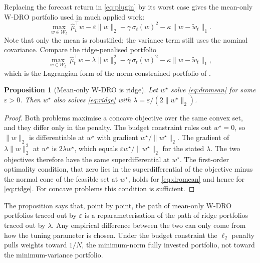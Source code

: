 \documentclass[11pt]{article}
\newtheorem{proposition}{Proposition}
\begin{document}
Replacing the forecast return in \eqref{eq:plugin} by its worst case gives the mean-only W-DRO portfolio used in much applied work:
\begin{equation}\label{eq:dromean}
\max_{w\in\mathcal{W}_t}\ \hat\mu_t^\top w-\varepsilon\lVert w\rVert_2-\gamma\,\sigma_t(w)^2-\kappa\lVert w-\tilde w_t\rVert_1 .
\end{equation}
Note that only the mean is robustified; the variance term still uses the nominal covariance. Compare the ridge-penalised portfolio
\begin{equation}\label{eq:ridge}
\max_{w\in\mathcal{W}_t}\ \hat\mu_t^\top w-\lambda\lVert w\rVert_2^2-\gamma\,\sigma_t(w)^2-\kappa\lVert w-\tilde w_t\rVert_1 ,
\end{equation}
which is the Lagrangian form of the norm-constrained portfolio of \citet{demiguel2009ms}.

\begin{proposition}[Mean-only W-DRO is ridge]\label{prop:ridge}
Let $w^\star$ solve \eqref{eq:dromean} for some $\varepsilon>0$. Then $w^\star$ also solves \eqref{eq:ridge} with $\lambda=\varepsilon/(2\lVert w^\star\rVert_2)$.
\end{proposition}
\begin{proof}
Both problems maximise a concave objective over the same convex set, and they differ only in the penalty. The budget constraint rules out $w^\star=0$, so $\lVert w\rVert_2$ is differentiable at $w^\star$ with gradient $w^\star/\lVert w^\star\rVert_2$. The gradient of $\lambda\lVert w\rVert_2^2$ at $w^\star$ is $2\lambda w^\star$, which equals $\varepsilon w^\star/\lVert w^\star\rVert_2$ for the stated $\lambda$. The two objectives therefore have the same superdifferential at $w^\star$. The first-order optimality condition, that zero lies in the superdifferential of the objective minus the normal cone of the feasible set at $w^\star$, holds for \eqref{eq:dromean} and hence for \eqref{eq:ridge}. For concave problems this condition is sufficient.
\end{proof}

The proposition says that, point by point, the path of mean-only W-DRO portfolios traced out by $\varepsilon$ is a reparameterisation of the path of ridge portfolios traced out by $\lambda$. Any empirical difference between the two can only come from how the tuning parameter is chosen. Under the budget constraint the $\ell_2$ penalty pulls weights toward $1/N$, the minimum-norm fully invested portfolio, not toward the minimum-variance portfolio.
\end{document}
